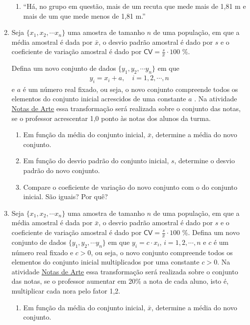 \begin{enumerate}
\begin{enumerate}
\item {} 
“Há, no grupo em questão, mais de um recuta que mede mais de 1,81 m e mais de um que mede menos de 1,81 m.”

\end{enumerate}

\item Seja \(\{x_1,x_2,\cdots x_n\}\) uma amostra de tamanho \(n\) de uma população, em que a média amostral é dada por \(\bar{x}\), o desvio padrão amostral é dado por \(s\) e o coeficiente de variação amostral é dado por \(\textsf{CV}=\frac{s}{\bar{x}}\cdot 100\) \%.

Defina um novo conjunto de dados \(\{y_1,y_2,\cdots y_n\}\) em que
\begin{equation*}
\begin{split}y_i=x_i+a,\quad  i=1,2,\cdots, n\end{split}
\end{equation*}
e \(a\) é um número real fixado, ou seja, o novo conjunto compreende todos os elementos do conjunto inicial acrescidos de uma constante \(a\) . Na atividade \hyperref[\detokenize{PE104-0:ativ-notas-de-artes}]{Notas de Arte} essa transformação será realizada sobre o conjunto das notas, se o professor acrescentar 1,0 ponto às notas dos alunos da turma.
\begin{enumerate}
\item {} 
Em função da média do conjunto inicial, \(\bar{x}\), determine a média do novo conjunto.

\item {} 
Em função do desvio padrão do conjunto inicial, \(s\), determine o desvio padrão do novo conjunto.

\item {} 
Compare o coeficiente de variação do novo conjunto com o do conjunto inicial. São iguais? Por quê?

\end{enumerate}

\item Seja \(\{x_1,x_2,\cdots x_n\}\) uma amostra de tamanho \(n\) de uma população, em que a média amostral é dada por \(\bar{x}\), o desvio padrão amostral é dado por \(s\) e o coeficiente de variação amostral é dado por \(\textsf{CV}=\frac{s}{\bar{x}}\cdot 100\) \%. Defina um novo conjunto de dados \(\{y_1,y_2,\cdots y_n\}\) em que \(y_i=c\cdot x_i\), \(i=1,2,\cdots, n\) e \(c\) é um número real fixado e \(c>0\), ou seja, o novo conjunto compreende todos os elementos do conjunto inicial multiplicados por uma constante \(c>0.\) Na atividade \hyperref[\detokenize{PE104-0:ativ-notas-de-artes}]{Notas de Arte} essa transformação será realizada sobre o conjunto das notas, se o professor aumentar em 20\% a nota de cada aluno, isto é, multiplicar cada nora pelo fator 1,2.
\begin{enumerate}
\item {} 
Em função da média do conjunto inicial, \(\bar{x}\), determine a média do novo conjunto.


\end{enumerate}
\end{enumerate}
